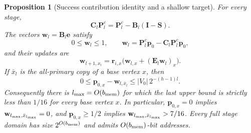 \documentclass[11pt]{article}
\numberwithin{equation}{section}
\newtheorem{proposition}[theorem]{Proposition}
\theoremstyle{definition}
\theoremstyle{remark}
\begin{document}
\begin{proposition}[Success contribution identity and a shallow target]
\label{prop:hier-reward-target}
For every stage,
\begin{equation}
 {\mathbf{C}}_l{\mathbf{P}}_l^c={\mathbf{P}}_l^c-{\mathbf{B}}_l({\mathbf{I}}-{\mathbf{S}}).
 \label{eq:hier-reward-algebra}
\end{equation}
The vectors ${\mathbf{w}}_l={\mathbf{B}}_l{\mathbf{e}}$ satisfy
\begin{equation}
 0\leq {\mathbf{w}}_l\leq1,\qquad
 {\mathbf{w}}_l={\mathbf{P}}_l^c{\mathbf{p}}_0-{\mathbf{C}}_l{\mathbf{P}}_l^c{\mathbf{p}}_0,
 \label{eq:hier-reward-bound}
\end{equation}
and their updates are
\begin{equation}
 {\mathbf{w}}_{l+1,x_i}={\mathbf{r}}_{i,x}\bigl({\mathbf{w}}_{l,x}+({\mathbf{E}}_l{\mathbf{w}}_l)_{x}\bigr).
 \label{eq:hier-reward-update}
\end{equation}
If $\bar x_l$ is the all-primary copy of a base vertex $x$, then
\begin{equation}
 0\leq {\mathbf{p}}_{0,x}-{\mathbf{w}}_{l,\bar x_l}
       \leq |V_0|\,2^{-({h}-1)l}.
 \label{eq:hier-final-error}
\end{equation}
Consequently there is ${l_{\rm max}}=O({b_{\rm mem}})$ for which the last upper bound is
strictly less than $1/16$ for every base vertex $x$.
In particular, ${\mathbf{p}}_{0,x}=0$ implies ${\mathbf{w}}_{l_{\rm max},\bar x_{l_{\rm max}}}=0$, and
${\mathbf{p}}_{0,x}\ge1/2$ implies ${\mathbf{w}}_{l_{\rm max},\bar x_{l_{\rm max}}}>7/16$.
Every full stage domain has size $2^{O({b_{\rm mem}})}$ and admits $O({b_{\rm mem}})$-bit
addresses.
\end{proposition}
\end{document}
